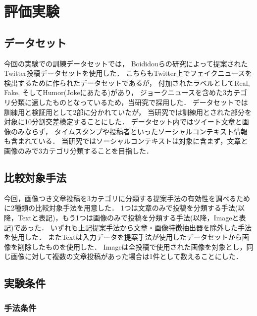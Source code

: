 %
\chapter{評価実験}\label{ch:experiment}
%
\section{データセット}
今回の実験での訓練データセットでは，
Boididouらの研究\cite{boididou2015verifying}によって提案されたTwitter投稿データセットを使用した．
こちらもTwitter上でフェイクニュースを検出するために作られたデータセットであるが，
付加されたラベルとしてReal, Fake, そしてHumor(Jokeにあたる)があり，
ジョークニュースを含めた3カテゴリ分類に適したものとなっているため，当研究で採用した．
データセットでは訓練用と検証用として2部に分かれていたが，
当研究では訓練用とされた部分を対象に10分割交差検定することにした．
データセット内ではツイート文章と画像のみならず，
タイムスタンプや投稿者といったソーシャルコンテキスト情報も含まれている．
当研究ではソーシャルコンテキストは対象に含まず，文章と画像のみで3カテゴリ分類することを目指した．
% 
\section{比較対象手法}
今回，画像つき文章投稿を3カテゴリに分類する提案手法の有効性を調べるために2種類の比較対象手法を用意した．
1つは文章のみで投稿を分類する手法(以降，Textと表記)，もう1つは画像のみで投稿を分類する手法(以降，Imageと表記)であった．
いずれも上記提案手法から文章・画像特徴抽出器を除外した手法を使用した．
またTextは入力データを提案手法が使用したデータセットから画像を削除したものを使用した．
Imageは全投稿で使用された画像を対象とし，同じ画像に対して複数の文章投稿があった場合は1件として数えることにした．
% 
\section{実験条件}
%
\subsection{手法条件}
